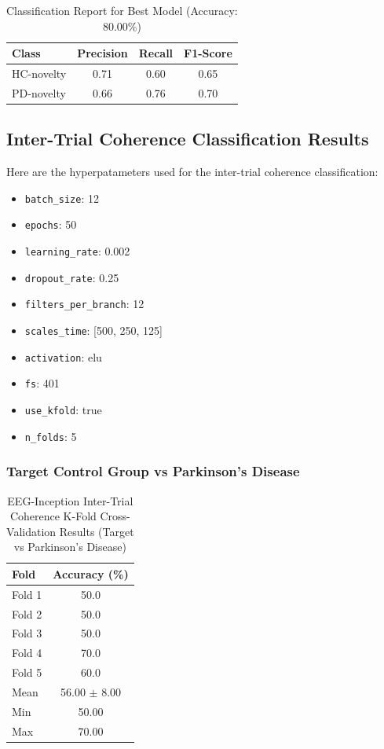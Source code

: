 \documentclass[12pt]{report}
\begin{document}
\begin{table}[h]
\centering
\caption{Classification Report for Best Model (Accuracy: 80.00\%)}
\begin{tabular}{lccc}
\hline
\textbf{Class} & \textbf{Precision} & \textbf{Recall} & \textbf{F1-Score} \\
\hline
HC-novelty & 0.71 & 0.60 & 0.65 \\
PD-novelty & 0.66 & 0.76 & 0.70 \\
\hline
\end{tabular}
\end{table}

\clearpage

\subsection{Inter-Trial Coherence Classification Results}
Here are the hyperpatameters used for the inter-trial coherence classification:

\begin{itemize}
    \item \texttt{batch\_size}: 12
    \item \texttt{epochs}: 50
    \item \texttt{learning\_rate}: 0.002
    \item \texttt{dropout\_rate}: 0.25
    \item \texttt{filters\_per\_branch}: 12
    \item \texttt{scales\_time}: [500, 250, 125]
    \item \texttt{activation}: elu
    \item \texttt{fs}: 401
    \item \texttt{use\_kfold}: true
    \item \texttt{n\_folds}: 5
\end{itemize}

\subsubsection{Target Control Group vs Parkinson's Disease}

\begin{table}[h]
\centering
\caption{EEG-Inception Inter-Trial Coherence K-Fold Cross-Validation Results (Target vs Parkinson's Disease)}
\begin{tabular}{lc}
\hline
\textbf{Fold} & \textbf{Accuracy (\%)} \\
\hline
Fold 1 & 50.0 \\
Fold 2 & 50.0 \\
Fold 3 & 50.0 \\
Fold 4 & 70.0 \\
Fold 5 & 60.0 \\
\hline
Mean & 56.00 $\pm$ 8.00 \\
Min & 50.00 \\
Max & 70.00 \\
\hline
\end{tabular}
\end{table}
\end{document}
